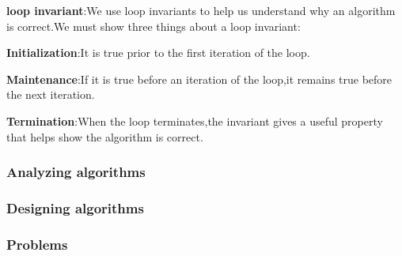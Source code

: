 \documentclass[UTF8,a4paper,12pt]{ctexart}
\begin{document}
                \textbf{loop invariant}:We use loop invariants to help us understand why an algorithm is correct.We must show three things about a loop invariant:

                \textbf{Initialization}:It is true prior to the first iteration of the loop.

                \textbf{Maintenance}:If it is true before an iteration of the loop,it remains true before the next iteration.

                \textbf{Termination}:When the loop terminates,the invariant gives a useful property that helps show the algorithm is correct.

            \subsubsection{Analyzing algorithms}
            \subsubsection{Designing algorithms}
            \subsubsection{Problems}      
\end{document}
